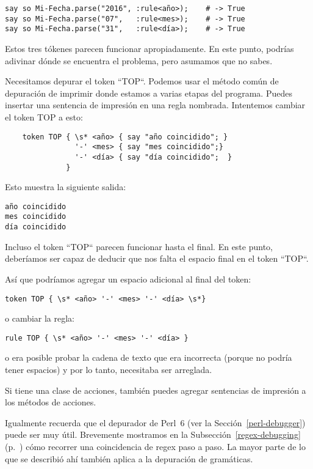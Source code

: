 \begin{verbatim}
say so Mi-Fecha.parse("2016", :rule<año>);    # -> True
say so Mi-Fecha.parse("07",   :rule<mes>);    # -> True
say so Mi-Fecha.parse("31",   :rule<día>);    # -> True
\end{verbatim}

Estos tres tókenes parecen funcionar apropiadamente. En este punto,
podrías adivinar dónde se encuentra el problema, pero 
asumamos que no sabes.

Necesitamos depurar el token ``TOP``. Podemos usar el método común
de depuración de imprimir donde estamos a varias etapas del
programa. Puedes insertar una sentencia de impresión en
una regla nombrada. Intentemos cambiar el token TOP a esto:

\begin{verbatim}
    token TOP { \s* <año> { say "año coincidido"; }
                '-' <mes> { say "mes coincidido";}
                '-' <día> { say "día coincidido";  }
              }
\end{verbatim}

Esto muestra la siguiente salida:

\begin{verbatim}
año coincidido
mes coincidido
día coincidido
\end{verbatim}


Incluso el token ``TOP`` parecen funcionar hasta el final. 
En este punto, deberíamos ser capaz de deducir que nos falta
el espacio final en el token ``TOP``.

Así que podríamos agregar un espacio adicional al final del
token:

\begin{verbatim}
token TOP { \s* <año> '-' <mes> '-' <día> \s*}
\end{verbatim}

o cambiar la regla:

\begin{verbatim}
rule TOP { \s* <año> '-' <mes> '-' <día> }
\end{verbatim}

o era posible probar la cadena de texto que era incorrecta (porque
no podría tener espacios) y por lo tanto, necesitaba ser arreglada.

Si tiene una clase de acciones, también puedes agregar sentencias de
impresión a los métodos de acciones.

Igualmente recuerda que el depurador de Perl~6 (ver 
la Sección~\ref{perl-debugger}) puede ser muy útil. 
Brevemente mostramos en la Subsección~\ref{regex-debugging} 
(p.~\pageref{regex-debugging}) cómo recorrer una coincidencia
de regex paso a paso. La mayor parte de lo que se describió 
ahí también aplica a la depuración de gramáticas.

